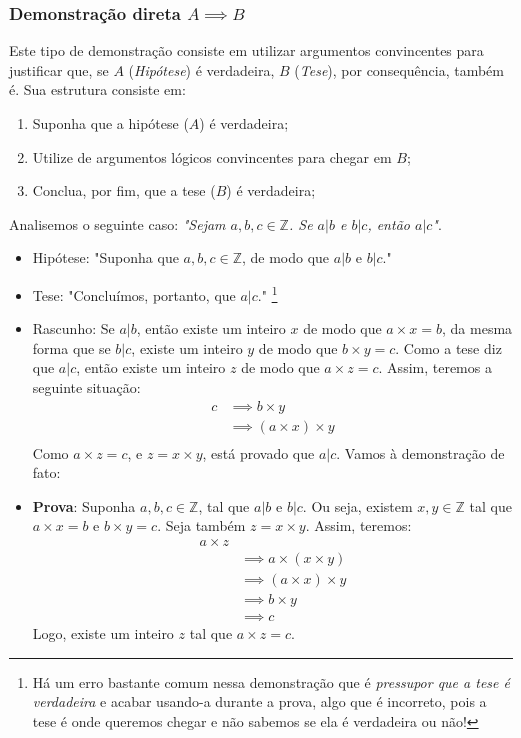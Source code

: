 \documentclass{article}
\begin{document}
\subsubsection{Demonstração direta $A \implies B$}
Este tipo de demonstração consiste em utilizar argumentos convincentes para justificar que, se $A$ (\emph{Hipótese}) é verdadeira, $B$ (\emph{Tese}), por consequência, também é.  
Sua estrutura consiste em:
\begin{enumerate}
    \item Suponha que a hipótese ($A$) é verdadeira;
    \item Utilize de argumentos lógicos convincentes para chegar em $B$;
    \item Conclua, por fim, que a tese ($B$) é verdadeira;
\end{enumerate}
Analisemos o seguinte caso: \emph{"Sejam $a, b, c \in \mathbb{Z}$. Se $a|b$ e $b|c$, então $a|c$"}.
\begin{itemize}
    \item Hipótese: "Suponha que $a, b, c \in \mathbb{Z}$, de modo que $a|b$ e $b|c$."
    \item Tese: "Concluímos, portanto, que $a|c$." \footnote{Há um erro bastante comum nessa demonstração que é \emph{pressupor que a tese é verdadeira} e acabar usando-a durante a prova, algo que é incorreto, pois a tese é onde queremos chegar e não sabemos se ela é verdadeira ou não!} 
    \item Rascunho: Se $a|b$, então existe um inteiro $x$ de modo que $a \times x = b$, da mesma forma que se $b|c$, existe um inteiro $y$ de modo que $b \times y = c$. Como a tese diz que $a|c$, então existe um inteiro $z$ de modo que $a \times z = c$.
    Assim, teremos a seguinte situação:
    \begin{align*}
    c &\implies 
    b \times y \\ &\implies
    (a \times x) \times y \\
    \end{align*}
    Como $a \times z = c$, e $z = x \times y$, está provado que $a|c$. Vamos à demonstração de fato:
    \item \textbf{Prova}: Suponha $a, b, c \in \mathbb{Z}$, tal que $a|b$ e $b|c$. Ou seja, existem $x, y \in \mathbb{Z}$
    tal que $a \times x = b$ e $b \times y = c$. Seja também $z = x \times y$. Assim, teremos: 
    \begin{align*}
        a \times z \\ &\implies
        a \times (x \times y) \\ &\implies
        (a \times x) \times y \\ &\implies
        b \times y \\ &\implies
        c
    \end{align*}
    Logo, existe um inteiro $z$ tal que $a \times z = c$.
\end{itemize}
\end{document}
